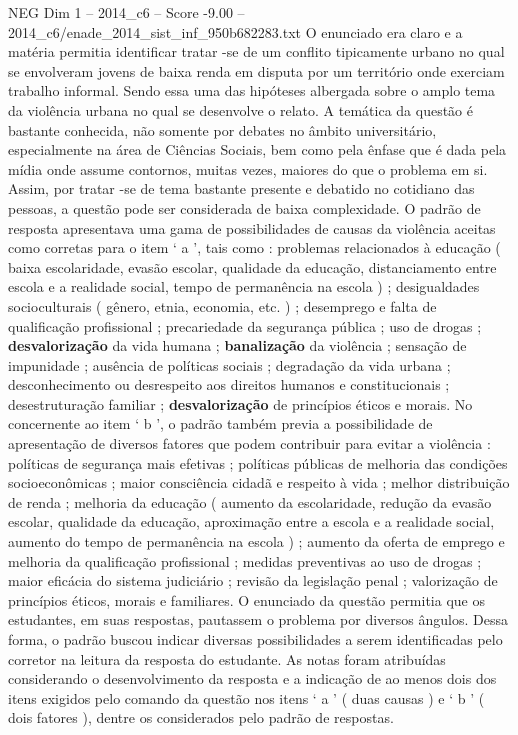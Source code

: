 \begin{textsample}{NEG Dim 1 – 2014\_c6 – Score -9.00 – 2014\_c6/enade\_2014\_sist\_inf\_950b682283.txt}
O enunciado era claro e a matéria permitia identificar tratar -se de um conflito tipicamente urbano no qual se envolveram jovens de baixa renda em disputa por um território onde exerciam trabalho informal.
Sendo essa uma das hipóteses albergada sobre o amplo tema da violência urbana no qual se desenvolve o relato.
A temática da questão é bastante conhecida, não somente por debates no âmbito universitário, especialmente na área de Ciências Sociais, bem como pela ênfase que é dada pela mídia onde assume contornos, muitas vezes, maiores do que o problema em si.
Assim, por tratar -se de tema bastante presente e debatido no cotidiano das pessoas, a questão pode ser considerada de baixa complexidade.
O padrão de resposta apresentava uma gama de possibilidades de causas da violência aceitas como corretas para o item ‘ a ’, tais como : problemas relacionados à educação ( baixa escolaridade, evasão escolar, qualidade da educação, distanciamento entre escola e a realidade social, tempo de permanência na escola ) ; desigualdades socioculturais ( gênero, etnia, economia, etc. ) ; desemprego e falta de qualificação profissional ; precariedade da segurança pública ; uso de drogas ; \textbf{desvalorização} da vida humana ; \textbf{banalização} da violência ; sensação de impunidade ; ausência de políticas sociais ; degradação da vida urbana ; desconhecimento ou desrespeito aos direitos humanos e constitucionais ; desestruturação familiar ; \textbf{desvalorização} de princípios éticos e morais.
No concernente ao item ‘ b ’, o padrão também previa a possibilidade de apresentação de diversos fatores que podem contribuir para evitar a violência : políticas de segurança mais efetivas ; políticas públicas de melhoria das condições socioeconômicas ; maior consciência cidadã e respeito à vida ; melhor distribuição de renda ; melhoria da educação ( aumento da escolaridade, redução da evasão escolar, qualidade da educação, aproximação entre a escola e a realidade social, aumento do tempo de permanência na escola ) ; aumento da oferta de emprego e melhoria da qualificação profissional ; medidas preventivas ao uso de drogas ; maior eficácia do sistema judiciário ; revisão da legislação penal ; valorização de princípios éticos, morais e familiares.
O enunciado da questão permitia que os estudantes, em suas respostas, pautassem o problema por diversos ângulos.
Dessa forma, o padrão buscou indicar diversas possibilidades a serem identificadas pelo corretor na leitura da resposta do estudante.
As notas foram atribuídas considerando o desenvolvimento da resposta e a indicação de ao menos dois dos itens exigidos pelo comando da questão nos itens ‘ a ’ ( duas causas ) e ‘ b ’ ( dois fatores ), dentre os considerados pelo padrão de respostas.

\end{textsample}
